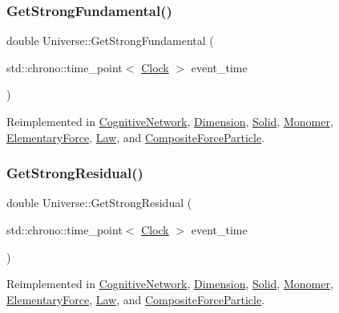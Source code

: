 \subsubsection{\texorpdfstring{Get\+Strong\+Fundamental()}{GetStrongFundamental()}}
{\footnotesize\ttfamily double Universe\+::\+Get\+Strong\+Fundamental (\begin{DoxyParamCaption}\item[{std\+::chrono\+::time\+\_\+point$<$ \mbox{\hyperlink{universe_8h_a0ef8d951d1ca5ab3cfaf7ab4c7a6fd80}{Clock}} $>$}]{event\+\_\+time }\end{DoxyParamCaption})\hspace{0.3cm}{\ttfamily [virtual]}}



Reimplemented in \mbox{\hyperlink{classCognitiveNetwork_a942ca90561fedae46136de620accbfea}{Cognitive\+Network}}, \mbox{\hyperlink{classDimension_ad0d067d7f9dc4841b0ad280979ebe7af}{Dimension}}, \mbox{\hyperlink{classSolid_ab3a972354b25ad1bbe8c3f3e7638e24c}{Solid}}, \mbox{\hyperlink{classMonomer_a4bc8b39086260e26a196b28b4fc6667f}{Monomer}}, \mbox{\hyperlink{classElementaryForce_a0974d6537c07dac2453d2a607324fa21}{Elementary\+Force}}, \mbox{\hyperlink{classLaw_afcdbea76524e5a52691fff7b526971e9}{Law}}, and \mbox{\hyperlink{classCompositeForceParticle_abc8597f3b4f7cf755ab4618bd624b046}{Composite\+Force\+Particle}}.

\mbox{\label{classUniverse_af0f4b81950061e63c2855eb40957a5b1}} 
\subsubsection{\texorpdfstring{Get\+Strong\+Residual()}{GetStrongResidual()}}
{\footnotesize\ttfamily double Universe\+::\+Get\+Strong\+Residual (\begin{DoxyParamCaption}\item[{std\+::chrono\+::time\+\_\+point$<$ \mbox{\hyperlink{universe_8h_a0ef8d951d1ca5ab3cfaf7ab4c7a6fd80}{Clock}} $>$}]{event\+\_\+time }\end{DoxyParamCaption})\hspace{0.3cm}{\ttfamily [virtual]}}



Reimplemented in \mbox{\hyperlink{classCognitiveNetwork_acfa5de663b3e686c4d9ea1a3bb483b11}{Cognitive\+Network}}, \mbox{\hyperlink{classDimension_aeee6025f17d9cd1bf7f324d715a30691}{Dimension}}, \mbox{\hyperlink{classSolid_a9cfde1c3a4b7c6d2a5a3719d74e27237}{Solid}}, \mbox{\hyperlink{classMonomer_a3b00168520f592098356f7cd3e663ad3}{Monomer}}, \mbox{\hyperlink{classElementaryForce_a3478c8ad35bce240055da7d4a03e555e}{Elementary\+Force}}, \mbox{\hyperlink{classLaw_a70fb2a7710776c4e2315a1e29fe35eb6}{Law}}, and \mbox{\hyperlink{classCompositeForceParticle_a24214566eb5b44340d5563b6583052e8}{Composite\+Force\+Particle}}.

